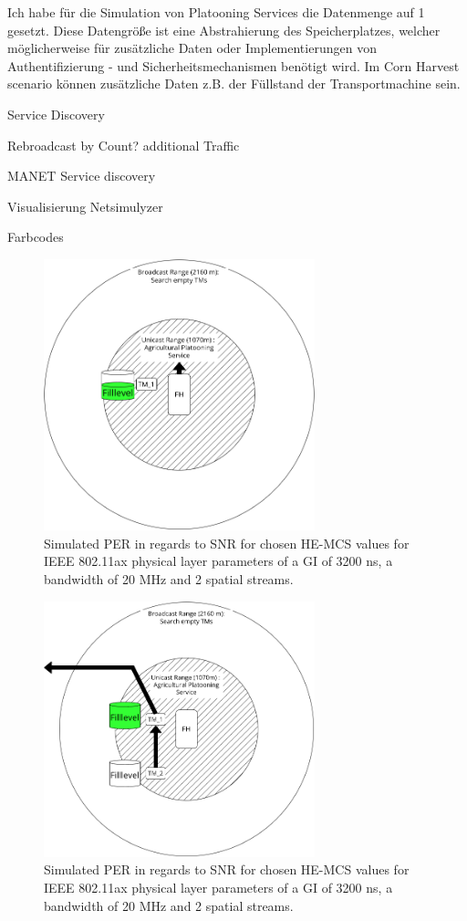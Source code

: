 Ich habe für die Simulation von Platooning Services die Datenmenge auf \SI{1}{\kilo\byte} gesetzt. Diese Datengröße ist eine Abstrahierung des Speicherplatzes, welcher möglicherweise für zusätzliche Daten oder Implementierungen von Authentifizierung -  und Sicherheitsmechanismen benötigt wird. Im Corn Harvest scenario können zusätzliche Daten z.B. der Füllstand der Transportmachine sein. 


Service Discovery

Rebroadcast by Count?
additional Traffic

MANET Service discovery

Visualisierung Netsimulyzer

Farbcodes

\begin{figure}[H]%
	\centering
	\includegraphics[width=0.7\textwidth]{figures/drawings-HALF_Full}
	\caption{Simulated PER in regards to SNR for chosen HE-MCS values for IEEE 802.11ax physical layer parameters
			of a GI of 3200 ns, a bandwidth of 20 MHz and 2 spatial streams.}
	\label{fig:PlatooningHF}%
\end{figure}

\begin{figure}[H]%
	\centering
	\includegraphics[width=0.7\textwidth]{figures/drawings-FULL}
	\caption{Simulated PER in regards to SNR for chosen HE-MCS values for IEEE 802.11ax physical layer parameters
			of a GI of 3200 ns, a bandwidth of 20 MHz and 2 spatial streams.}
	\label{fig:PlatooningFull}%
\end{figure}


